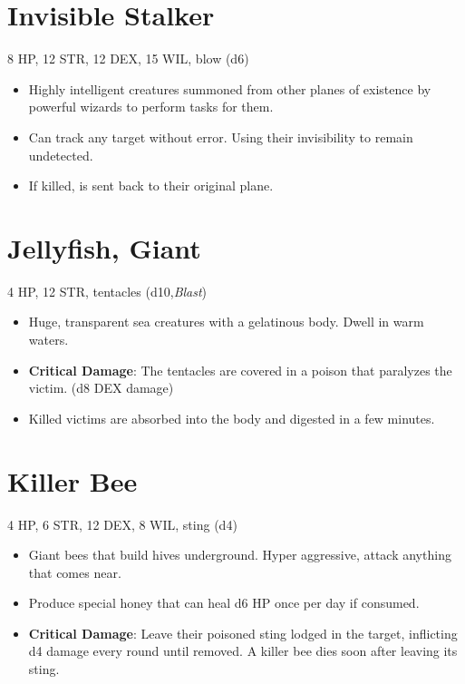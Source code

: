 \documentclass[
  10pt,
  american,
]{article}
\begin{document}
\hypertarget{invisible-stalker}{%
\section{Invisible Stalker}\label{invisible-stalker}}

8 HP, 12 STR, 12 DEX, 15 WIL, blow (d6)

\begin{samepage}
\begin{itemize}
\setlength\itemsep{-.5em}
\item Highly intelligent creatures summoned from other planes of existence by powerful wizards to perform tasks for them.
\item Can track any target without error. Using their invisibility to remain undetected.
\item If killed, is sent back to their original plane.
\end{itemize}
\end{samepage}

\hypertarget{jellyfish-giant}{%
\section{Jellyfish, Giant}\label{jellyfish-giant}}

4 HP, 12 STR, tentacles (d10,\emph{Blast})

\begin{samepage}
\begin{itemize}
\setlength\itemsep{-.5em}
\item Huge, transparent sea creatures with a gelatinous body. Dwell in warm waters.
\item \textbf{Critical Damage}: The tentacles are covered in a poison that paralyzes the victim. (d8 DEX damage)
\item Killed victims are absorbed into the body and digested in a few minutes.
\end{itemize}
\end{samepage}

\hypertarget{killer-bee}{%
\section{Killer Bee}\label{killer-bee}}

4 HP, 6 STR, 12 DEX, 8 WIL, sting (d4)

\begin{samepage}
\begin{itemize}
\setlength\itemsep{-.5em}
\item Giant bees that build hives underground. Hyper aggressive, attack anything that comes near.
\item Produce special honey that can heal d6 HP once per day if consumed.
\item \textbf{Critical Damage}: Leave their poisoned sting lodged in the target, inflicting d4 damage every round until removed. A killer bee dies soon after leaving its sting.
\end{itemize}
\end{samepage}
\end{document}
